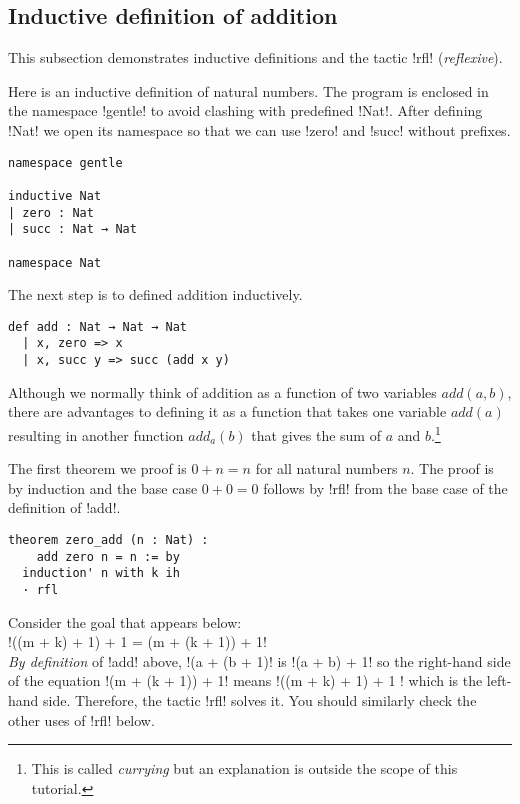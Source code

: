 \subsection{Inductive definition of addition}

This subsection demonstrates inductive definitions and the tactic !rfl! (\emph{reflexive}).

Here is an inductive definition of natural numbers. The program is enclosed in the namespace !gentle! to avoid clashing with predefined !Nat!. After defining !Nat! we open its namespace so that we can use !zero! and !succ! without prefixes.
\begin{Verbatim}
namespace gentle

inductive Nat
| zero : Nat
| succ : Nat → Nat

namespace Nat
\end{Verbatim}

The next step is to defined addition inductively.
\begin{Verbatim}[firstnumber=last]
def add : Nat → Nat → Nat
  | x, zero => x
  | x, succ y => succ (add x y)
\end{Verbatim}
Although we normally think of addition as a function of two variables $\textit{add}(a,b)$, there are advantages to defining it as a function that takes one variable $\textit{add}(a)$ resulting in another function $\textit{add}_{a}(b)$ that gives the sum of $a$ and $b$.\footnote{This is called \emph{currying} but an explanation is outside the scope of this tutorial.}

The first theorem we proof is $0+n=n$ for all natural numbers $n$. The proof is by induction and the base case $0+0=0$ follows by !rfl! from the base case of the definition of !add!.
\begin{Verbatim}[firstnumber=last]
theorem zero_add (n : Nat) :
    add zero n = n := by
  induction' n with k ih
  · rfl
\end{Verbatim}


Consider the goal that appears below:\\
\indnt{}!((m + k) + 1) + 1 = (m + (k + 1)) + 1!\\
\emph{By definition} of !add! above, !(a + (b + 1)! is !(a + b) + 1! so the right-hand side of the equation !(m + (k + 1)) + 1! means !((m + k) + 1) + 1 ! which is the left-hand side. Therefore, the tactic !rfl! solves it. You should similarly check the other uses of !rfl! below.

